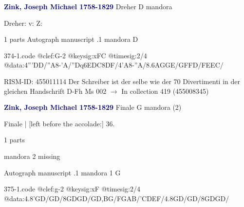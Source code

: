 \documentclass[twocolumn]{book}
\begin{document}
\newline \par \vspace{7pt} \textcolor{darkblue}{\textbf{Zink, Joseph Michael  1758-1829}}
\newline Dreher  D  
\newline mandora
\newline \begin{itshape}[f.39v, at left:] Dreher: v: Z:\end{itshape} 
\newline \textcolor{darkblue}{}  1 parts  
\newline Autograph manuscript
.1  mandora  D  
\begin{filecontents*}{374-1.code}
@clef:G-2
@keysig:xFC
@timesig:2/4
@data:4'''DD/''A8-'A/{''Dq6EDC}{8DF}/4'A8-''A/{8.6AGGE}/{GFFD}/{FEEC}/
\end{filecontents*}
\newline
%

\newline RISM-ID: 455011114
\newline Der Schreiber ist der selbe wie der 70 Divertimenti in der gleichen Handschrift
\newline D-Fh  Ms 002
\newline $\rightarrow$ In collection 419 (455008345)

\newline \par \vspace{7pt} \textcolor{darkblue}{\textbf{Zink, Joseph Michael  1758-1829}}
\newline Finale  G  
\newline mandora (2)
\newline \begin{itshape}[f.21r, at left:] Finale | [left before the accolade:] 36.\end{itshape} 
\newline \textcolor{darkblue}{}  1 parts  
\newline \begin{small} mandora 2 missing\end{small} 
\newline Autograph manuscript
.1  mandora 1  G  
\begin{filecontents*}{375-1.code}
@clef:g-2
@keysig:xF
@timesig:2/4
@data:4.8'GD/GD/8GDGD/GD,BG/FGAB/'CDEF/4.8GD/GD/8GDGD/
\end{filecontents*}
\newline
%
\end{document}
